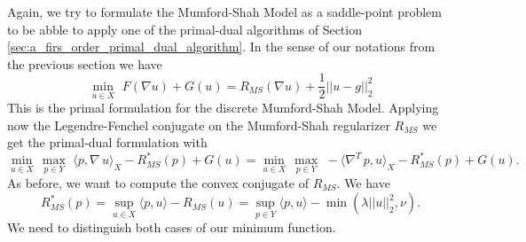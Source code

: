         Again, we try to formulate the Mumford-Shah Model as a saddle-point problem to be abble to apply one of the primal-dual algorithms of Section \ref{sec:a_firs_order_primal_dual_algorithm}. In the sense of our notations from the previous section we have
            \begin{equation}
                \min_{u \in X}\,\, F(\nabla u) + G(u) = R_{MS}(\nabla u) + \frac{1}{2} ||u - g||_{2}^{2}
                \label{eq:primal_mumford_shah_model}
            \end{equation}
        This is the primal formulation for the discrete Mumford-Shah Model. Applying now the Legendre-Fenchel conjugate on the Mumford-Shah regularizer $R_{MS}$ we get the primal-dual formulation with
            \begin{equation}
                \min_{u \in X}\, \max_{p \in Y}\,\, \langle p, \nabla \, u \rangle_{X} - R_{MS}^{\ast}(p) + G(u) = \min_{u \in X}\, \max_{p \in Y}\,\, -\langle \nabla^{T}\,p, u \rangle_{X} - R_{MS}^{\ast}(p) + G(u).
            \label{eq:primal_dual_mumford_shah_model}
            \end{equation}
        As before, we want to compute the convex conjugate of $R_{MS}$. We have
            $$
                R_{MS}^{\ast}(p) = \sup_{u \in X} \langle p, u \rangle - R_{MS}(u) = \sup_{p \in Y} \langle p, u \rangle - \min(\lambda ||u||_{2}^{2}, \nu).
            $$
        We need to distinguish both cases of our minimum function.
